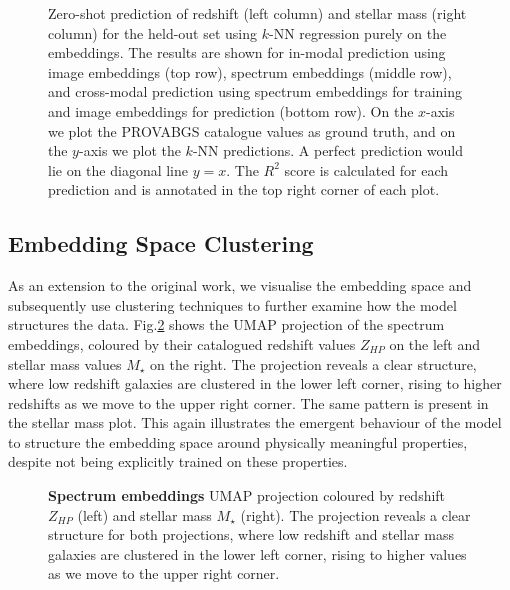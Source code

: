 \documentclass[a4paper,12pt]{article}
\begin{document}
\begin{figure}[H]
    \caption{Zero-shot prediction of redshift (left column) and stellar mass (right column) for the held-out set using $k$-NN regression purely on the embeddings. The results are shown for in-modal prediction using image embeddings (top row), spectrum embeddings (middle row), and cross-modal prediction using spectrum embeddings for training and image embeddings for prediction (bottom row). On the $x$-axis we plot the PROVABGS catalogue values as ground truth, and on the $y$-axis we plot the $k$-NN predictions. A perfect prediction would lie on the diagonal line $ y = x $. The $R^2$ score is calculated for each prediction and is annotated in the top right corner of each plot.}
    \label{fig:zeroshot}
\end{figure}



\subsection{Embedding Space Clustering}
As an extension to the original work, we visualise the embedding space and subsequently use clustering techniques to further examine how the model structures the data. Fig.\ref{fig:umap_of_spectra} shows the UMAP projection of the spectrum embeddings, coloured by their catalogued redshift values $Z_{HP}$ on the left and stellar mass values $M_{\star}$ on the right. The projection reveals a clear structure, where low redshift galaxies are clustered in the lower left corner, rising to higher redshifts as we move to the upper right corner. The same pattern is present in the stellar mass plot. This again illustrates the emergent behaviour of the model to structure the embedding space around physically meaningful properties, despite not being explicitly trained on these properties. 


\begin{figure}[H]
    \centering
    \caption{\textbf{Spectrum embeddings} UMAP projection coloured by redshift $Z_{HP}$ (left) and stellar mass $M_{\star}$ (right). The projection reveals a clear structure for both projections, where low redshift and stellar mass galaxies are clustered in the lower left corner, rising to higher values as we move to the upper right corner.}
    \label{fig:umap_of_spectra}
\end{figure}
\end{document}
